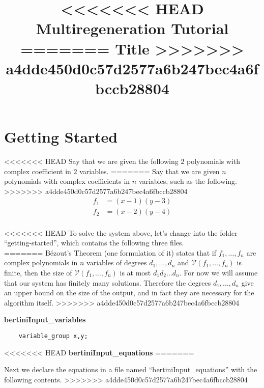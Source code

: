 \documentclass[12pt]{article}
\title{\large \bf
<<<<<<< HEAD
Multiregeneration Tutorial
=======
Title
>>>>>>> a4dde450d0c57d2577a6b247bec4a6fbccb28804
}
\author{}
\newcommand{\C}{\mathbb{C}}
\begin{document}
\maketitle
\section{Getting Started}
<<<<<<< HEAD
Say that we are given the following $2$ polynomials
with complex coefficient in $2$ variables. 
=======
Say that we are given $n$ polynomials
with complex coefficients 
in $n$ variables, such as the 
following. 
>>>>>>> a4dde450d0c57d2577a6b247bec4a6fbccb28804
\begin{align*}
    f_1 &= (x-1)(y-3)\\
    f_2 &= (x-2)(y-4)\\
\end{align*}


<<<<<<< HEAD
\noindent To solve the system above, let's change into the folder 
``getting-started'', which contains the following three files.\\
=======
B\'{e}zout's Theorem (one formulation of it) states that if 
$f_1, \ldots, f_n$ are complex polynomials
 in $n$ variables of degrees 
$d_1, \ldots, d_n$ and $\mathcal{V}(f_1, \ldots, f_n)$ is finite, then 
the size of $\mathcal{V}(f_1, \ldots, f_n)$ is at most $d_1d_2 \ldots d_n$. 
For now we will assume that our system has finitely many solutions.
Therefore the degrees $d_1, \ldots, d_n$ give an upper bound on the size 
of the output, and in fact they are necessary for the algorithm itself.
>>>>>>> a4dde450d0c57d2577a6b247bec4a6fbccb28804

\noindent \textbf{bertiniInput\_variables}

\begin{lstlisting}
    variable_group x,y; 
\end{lstlisting}

<<<<<<< HEAD
\noindent \textbf{bertiniInput\_equations}
=======

Next we declare the equations in a file named ``bertiniInput\_equations'' 
with the following contents.
>>>>>>> a4dde450d0c57d2577a6b247bec4a6fbccb28804
\end{document}
